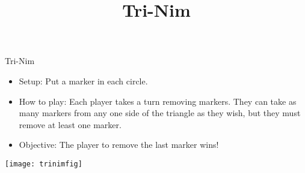 \documentclass[12pt]{report}
\title{Tri-Nim}
\begin{document}
\thispagestyle{empty}

\begin{center}
  \Huge{Tri-Nim}
\end{center}

\begin{itemize}
\item Setup: Put a marker in each circle.
\item How to play: Each player takes a turn removing markers.  They
  can take as many markers from any one side of the triangle as they
  wish, but they must remove at least one marker.
\item Objective: The player to remove the last marker wins!
\end{itemize}
  
\begin{center}
  \texttt{[image: trinimfig]}
\end{center}
\end{document}
